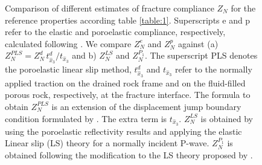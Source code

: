 \documentclass[draft,jgrga]{agutexSI2019}
\begin{document}
\begin{figure}[hp]
\centering
\caption {Comparison of different estimates of fracture compliance $Z_N$ for the reference properties according table \ref{table:1}. Superscripts e and p refer to the elastic and poroelastic compliance, respectively, calculated following . We compare $Z_N^e$ and $Z_N^p$ against (a) $Z_N^{PLS} = Z_N^d \, t_{\hat x_3}^d /t_{\hat x_3}$ and  b) $Z_N^{LS}$  and $Z_N^{P_1}$. The superscript PLS denotes the poroelastic linear slip method, $t_{\hat x_3}^d$ and $t_{\hat x_3}$ refer to the normally applied traction on the drained rock frame and on the fluid-filled porous rock, respectively, at the fracture interface. The formula to obtain $Z_N^{PLS}$ is an extension of the displacement jump boundary condition formulated by . The extra term is  $t_{\hat x_3}$. $Z_N^{LS}$ is obtained by using the poroelastic reflectivity results and applying the elastic Linear slip (LS) theory \cite{schoenberg1980elastic} for a normally incident P-wave. $Z_N^{P_1}$ is obtained following the modification to the LS theory proposed by . }
\label{fig:11}
\end{figure}

\end{document}

